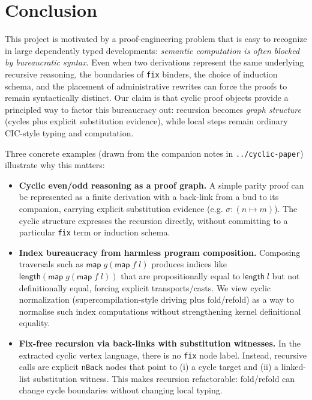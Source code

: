 \section{Conclusion}

This project is motivated by a proof-engineering problem that is easy to recognize in large dependently typed developments: 
\emph{semantic computation is often blocked by bureaucratic syntax}.
Even when two derivations represent the same underlying recursive reasoning, the boundaries of \texttt{fix} binders, the choice of induction schema, and the placement of administrative rewrites can force the proofs to remain syntactically distinct.
Our claim is that cyclic proof objects provide a principled way to factor this bureaucracy out: recursion becomes \emph{graph structure} (cycles plus explicit substitution evidence), while local steps remain ordinary CIC-style typing and computation.

Three concrete examples (drawn from the companion notes in \texttt{../cyclic-paper}) illustrate why this matters:
\begin{itemize}
\item \textbf{Cyclic even/odd reasoning as a proof graph.}
  A simple parity proof can be represented as a finite derivation with a back-link from a bud to its companion, carrying explicit substitution evidence (e.g. \(\sigma : (n\mapsto m)\)).
  The cyclic structure expresses the recursion directly, without committing to a particular \texttt{fix} term or induction schema.
\item \textbf{Index bureaucracy from harmless program composition.}
  Composing traversals such as \(\mathsf{map}\;g (\mathsf{map}\;f\;l)\) produces indices like \(\mathsf{length}(\mathsf{map}\;g(\mathsf{map}\;f\;l))\) that are propositionally equal to \(\mathsf{length}\;l\) but not definitionally equal, forcing explicit transports/casts.
  We view cyclic normalization (supercompilation-style driving plus fold/refold) as a way to normalise such index computations without strengthening kernel definitional equality.
\item \textbf{Fix-free recursion via back-links with substitution witnesses.}
  In the extracted cyclic vertex language, there is no \texttt{fix} node label.
  Instead, recursive calls are explicit \texttt{nBack} nodes that point to (i) a cycle target and (ii) a linked-list substitution witness.
  This makes recursion refactorable: fold/refold can change cycle boundaries without changing local typing.
\end{itemize}

